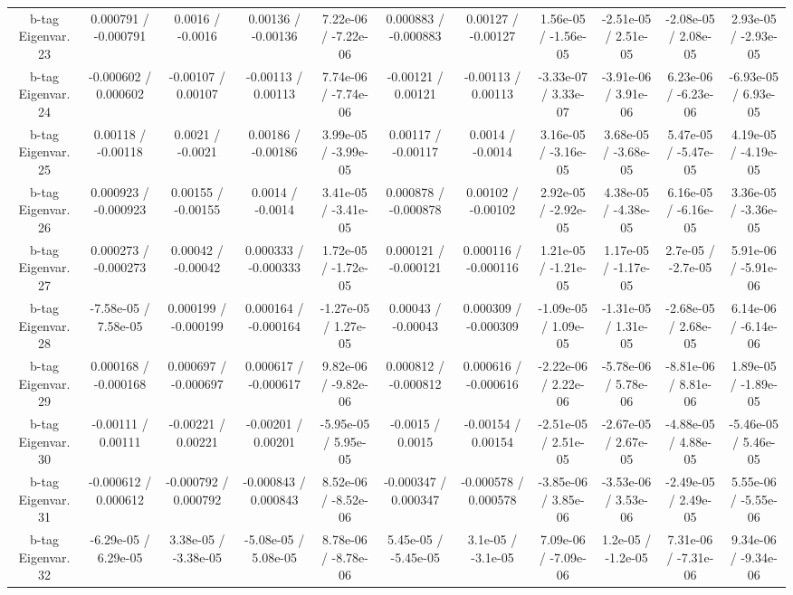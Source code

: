 \begin{table}[htbp]
\begin{center}
\begin{tabular}{|c|c|c|c|c|c|c|c|c|c|c|}
  b-tag Eigenvar. 23 & 0.000791 / -0.000791 & 0.0016 / -0.0016 & 0.00136 / -0.00136 & 7.22e-06 / -7.22e-06 & 0.000883 / -0.000883 & 0.00127 / -0.00127 & 1.56e-05 / -1.56e-05 & -2.51e-05 / 2.51e-05 & -2.08e-05 / 2.08e-05 & 2.93e-05 / -2.93e-05 \\ 
  b-tag Eigenvar. 24 & -0.000602 / 0.000602 & -0.00107 / 0.00107 & -0.00113 / 0.00113 & 7.74e-06 / -7.74e-06 & -0.00121 / 0.00121 & -0.00113 / 0.00113 & -3.33e-07 / 3.33e-07 & -3.91e-06 / 3.91e-06 & 6.23e-06 / -6.23e-06 & -6.93e-05 / 6.93e-05 \\ 
  b-tag Eigenvar. 25 & 0.00118 / -0.00118 & 0.0021 / -0.0021 & 0.00186 / -0.00186 & 3.99e-05 / -3.99e-05 & 0.00117 / -0.00117 & 0.0014 / -0.0014 & 3.16e-05 / -3.16e-05 & 3.68e-05 / -3.68e-05 & 5.47e-05 / -5.47e-05 & 4.19e-05 / -4.19e-05 \\ 
  b-tag Eigenvar. 26 & 0.000923 / -0.000923 & 0.00155 / -0.00155 & 0.0014 / -0.0014 & 3.41e-05 / -3.41e-05 & 0.000878 / -0.000878 & 0.00102 / -0.00102 & 2.92e-05 / -2.92e-05 & 4.38e-05 / -4.38e-05 & 6.16e-05 / -6.16e-05 & 3.36e-05 / -3.36e-05 \\ 
  b-tag Eigenvar. 27 & 0.000273 / -0.000273 & 0.00042 / -0.00042 & 0.000333 / -0.000333 & 1.72e-05 / -1.72e-05 & 0.000121 / -0.000121 & 0.000116 / -0.000116 & 1.21e-05 / -1.21e-05 & 1.17e-05 / -1.17e-05 & 2.7e-05 / -2.7e-05 & 5.91e-06 / -5.91e-06 \\ 
  b-tag Eigenvar. 28 & -7.58e-05 / 7.58e-05 & 0.000199 / -0.000199 & 0.000164 / -0.000164 & -1.27e-05 / 1.27e-05 & 0.00043 / -0.00043 & 0.000309 / -0.000309 & -1.09e-05 / 1.09e-05 & -1.31e-05 / 1.31e-05 & -2.68e-05 / 2.68e-05 & 6.14e-06 / -6.14e-06 \\ 
  b-tag Eigenvar. 29 & 0.000168 / -0.000168 & 0.000697 / -0.000697 & 0.000617 / -0.000617 & 9.82e-06 / -9.82e-06 & 0.000812 / -0.000812 & 0.000616 / -0.000616 & -2.22e-06 / 2.22e-06 & -5.78e-06 / 5.78e-06 & -8.81e-06 / 8.81e-06 & 1.89e-05 / -1.89e-05 \\ 
  b-tag Eigenvar. 30 & -0.00111 / 0.00111 & -0.00221 / 0.00221 & -0.00201 / 0.00201 & -5.95e-05 / 5.95e-05 & -0.0015 / 0.0015 & -0.00154 / 0.00154 & -2.51e-05 / 2.51e-05 & -2.67e-05 / 2.67e-05 & -4.88e-05 / 4.88e-05 & -5.46e-05 / 5.46e-05 \\ 
  b-tag Eigenvar. 31 & -0.000612 / 0.000612 & -0.000792 / 0.000792 & -0.000843 / 0.000843 & 8.52e-06 / -8.52e-06 & -0.000347 / 0.000347 & -0.000578 / 0.000578 & -3.85e-06 / 3.85e-06 & -3.53e-06 / 3.53e-06 & -2.49e-05 / 2.49e-05 & 5.55e-06 / -5.55e-06 \\ 
  b-tag Eigenvar. 32 & -6.29e-05 / 6.29e-05 & 3.38e-05 / -3.38e-05 & -5.08e-05 / 5.08e-05 & 8.78e-06 / -8.78e-06 & 5.45e-05 / -5.45e-05 & 3.1e-05 / -3.1e-05 & 7.09e-06 / -7.09e-06 & 1.2e-05 / -1.2e-05 & 7.31e-06 / -7.31e-06 & 9.34e-06 / -9.34e-06 \\ 

\end{tabular}
\end{center}
\end{table}
